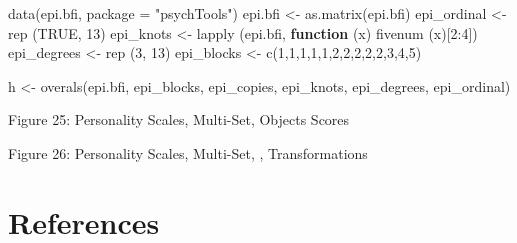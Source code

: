 \documentclass[
  12pt,
  letterpaper,
  DIV=11,
  numbers=noendperiod]{scrreprt}
\newenvironment{Shaded}{\begin{snugshade}}{\end{snugshade}}
\newcommand{\AttributeTok}[1]{\textcolor[rgb]{0.40,0.45,0.13}{#1}}
\newcommand{\ConstantTok}[1]{\textcolor[rgb]{0.56,0.35,0.01}{#1}}
\newcommand{\ControlFlowTok}[1]{\textcolor[rgb]{0.00,0.23,0.31}{\textbf{#1}}}
\newcommand{\DecValTok}[1]{\textcolor[rgb]{0.68,0.00,0.00}{#1}}
\newcommand{\FunctionTok}[1]{\textcolor[rgb]{0.28,0.35,0.67}{#1}}
\newcommand{\NormalTok}[1]{\textcolor[rgb]{0.00,0.23,0.31}{#1}}
\newcommand{\OtherTok}[1]{\textcolor[rgb]{0.00,0.23,0.31}{#1}}
\newcommand{\SpecialCharTok}[1]{\textcolor[rgb]{0.37,0.37,0.37}{#1}}
\newcommand{\StringTok}[1]{\textcolor[rgb]{0.13,0.47,0.30}{#1}}
\begin{document}
\begin{Shaded}
\begin{Highlighting}[]
\FunctionTok{data}\NormalTok{(epi.bfi, }\AttributeTok{package =} \StringTok{"psychTools"}\NormalTok{)}
\NormalTok{epi.bfi }\OtherTok{\textless{}{-}} \FunctionTok{as.matrix}\NormalTok{(epi.bfi)}
\NormalTok{epi\_ordinal }\OtherTok{\textless{}{-}} \FunctionTok{rep}\NormalTok{ (}\ConstantTok{TRUE}\NormalTok{, }\DecValTok{13}\NormalTok{)}
\NormalTok{epi\_knots }\OtherTok{\textless{}{-}} \FunctionTok{lapply}\NormalTok{ (epi.bfi, }\ControlFlowTok{function}\NormalTok{ (x) }\FunctionTok{fivenum}\NormalTok{ (x)[}\DecValTok{2}\SpecialCharTok{:}\DecValTok{4}\NormalTok{])}
\NormalTok{epi\_degrees }\OtherTok{\textless{}{-}} \FunctionTok{rep}\NormalTok{ (}\DecValTok{3}\NormalTok{, }\DecValTok{13}\NormalTok{)}
\NormalTok{epi\_blocks }\OtherTok{\textless{}{-}} \FunctionTok{c}\NormalTok{(}\DecValTok{1}\NormalTok{,}\DecValTok{1}\NormalTok{,}\DecValTok{1}\NormalTok{,}\DecValTok{1}\NormalTok{,}\DecValTok{1}\NormalTok{,}\DecValTok{2}\NormalTok{,}\DecValTok{2}\NormalTok{,}\DecValTok{2}\NormalTok{,}\DecValTok{2}\NormalTok{,}\DecValTok{2}\NormalTok{,}\DecValTok{3}\NormalTok{,}\DecValTok{4}\NormalTok{,}\DecValTok{5}\NormalTok{)}
\end{Highlighting}
\end{Shaded}

\begin{Shaded}
\begin{Highlighting}[]
\NormalTok{h }\OtherTok{\textless{}{-}} \FunctionTok{overals}\NormalTok{(epi.bfi, epi\_blocks, epi\_copies, epi\_knots, epi\_degrees, epi\_ordinal)}
\end{Highlighting}
\end{Shaded}

Figure 25: Personality Scales, Multi-Set, Objects Scores

Figure 26: Personality Scales, Multi-Set, , Transformations


\chapter*{References}\label{references}

\end{document}
